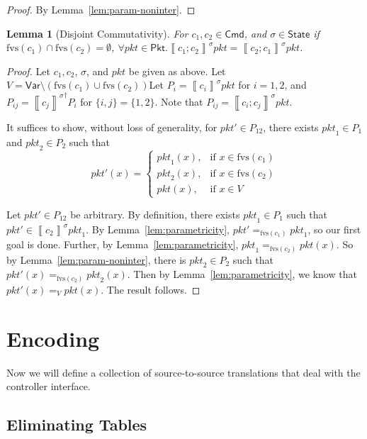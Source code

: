 \documentclass{article}
\newcommand{\pkt}{\mathit{pkt}}
\newcommand{\denote}[1]{\left\llbracket#1\right\rrbracket}
\newcommand{\Cmd}{\mathsf{Cmd}}
\newcommand{\Pkt}{\mathsf{Pkt}}
\newcommand{\Var}{\mathsf{Var}}
\newcommand{\State}{\mathsf{State}}
\newcommand{\fvs}{\textrm{fvs}}
\theoremstyle{plain}
\newtheorem{lemma}{Lemma}
\theoremstyle{definition}
\theoremstyle{remark}
\begin{document}
\begin{proof}
  By Lemma~\ref{lem:param-noninter}.
\end{proof}


\begin{lemma}[Disjoint Commutativity]
  \label{lem:disj-comm}
  For $c_1,c_2 \in \Cmd$, and $\sigma \in \State$ if $\fvs(c_1) \cap
  \fvs(c_2) = \emptyset$, $ \forall \pkt \in \Pkt. \denote{c_1;c_2}^\sigma\pkt =
  \denote{c_2;c_1}^\sigma \pkt$.
\end{lemma}
\begin{proof}
  Let $c_1, c_2$, $\sigma$, and $\pkt$ be given as above. Let $V = \Var
  \setminus (\fvs(c_1)\cup \fvs(c_2))$Let $P_i = \denote{c_i}^\sigma \pkt$ for
  $i = 1,2$, and $P_{ij} = { \denote{c_j}^\sigma}^\dagger P_i$ for $\{i,j\} =
  \{1,2\}$. Note that $P_{ij} = \denote{c_i;c_j}^\sigma \pkt$.

  It suffices to show, without loss of generality, for $\pkt' \in P_{12}$,
  there exists $\pkt_1 \in P_1$ and $\pkt_2 \in P_2$ such that
  \[\pkt'(x) = \begin{cases}
    \pkt_1(x),& \text{if } x \in \fvs(c_1)\\
    \pkt_2(x),& \text{if } x \in \fvs(c_2)\\
    \pkt(x), & \text{if } x \in V
  \end{cases} \]


  Let $\pkt' \in P_{12}$ be arbitrary. By definition, there exists $\pkt_1 \in
  P_1$ such that $\pkt' \in \denote{c_2}^\sigma \pkt_1$. By
  Lemma~\ref{lem:parametricity}, $\pkt'=_{\fvs(c_1)} \pkt_1$, so our first goal
  is done. Further, by Lemma~\ref{lem:parametricity}, $\pkt_1 =_{\fvs(c_2)}
  \pkt(x)$. So by Lemma~\ref{lem:param-noninter}, there is $\pkt_2 \in P_2$
  such that $\pkt'(x) =_{\fvs(c_2)} \pkt_2(x)$. Then by
  Lemma~\ref{lem:parametricity}, we know that $\pkt'(x) =_V \pkt(x)$. The result
  follows.
\end{proof}


\section{Encoding}

Now we will define a collection of source-to-source translations that deal with
the controller interface.

\subsection{Eliminating Tables}
\end{document}
